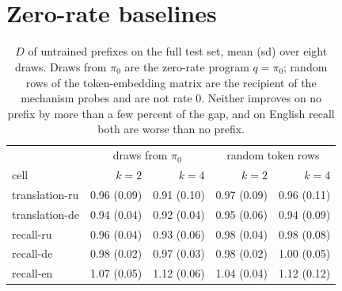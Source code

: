 \documentclass{article}
\newcommand{\Dh}{\hat D}
\begin{document}
\section{Zero-rate baselines}\label{app:baseline}
\begin{table}[H]
\centering\small
\begin{tabular}{lrrrr}
\toprule
 & \multicolumn{2}{c}{draws from $\pi_0$} & \multicolumn{2}{c}{random token rows} \\
cell & $k=2$ & $k=4$ & $k=2$ & $k=4$ \\
\midrule
translation-ru & 0.96 (0.09) & 0.91 (0.10) & 0.97 (0.09) & 0.96 (0.11) \\
translation-de & 0.94 (0.04) & 0.92 (0.04) & 0.95 (0.06) & 0.94 (0.09) \\
recall-ru & 0.96 (0.04) & 0.93 (0.06) & 0.98 (0.04) & 0.98 (0.08) \\
recall-de & 0.98 (0.02) & 0.97 (0.03) & 0.98 (0.02) & 1.00 (0.05) \\
recall-en & 1.07 (0.05) & 1.12 (0.06) & 1.04 (0.04) & 1.12 (0.12) \\
\bottomrule
\end{tabular}
\caption{$\Dh$ of untrained prefixes on the full test set, mean (sd) over eight draws. Draws from $\pi_0$ are the zero-rate program $q=\pi_0$; random rows of the token-embedding matrix are the recipient of the mechanism probes and are not rate 0. Neither improves on no prefix by more than a few percent of the gap, and on English recall both are worse than no prefix.}
\label{tab:baseline}
\end{table}

\FloatBarrier
\end{document}
